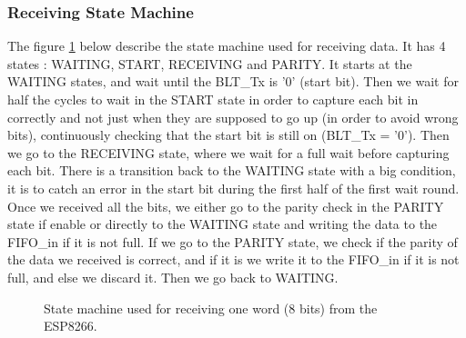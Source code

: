 \documentclass[11pt]{article}
\begin{document}
\subsubsection{Receiving State Machine}
The figure \ref{UART_receive_SM} below describe the state machine used for receiving data. It has 4 states : WAITING, START, RECEIVING and PARITY. It starts at the WAITING states, and wait until the BLT\_Tx is '0' (start bit). Then we wait for half the cycles to wait in the START state in order to capture each bit in correctly and not just when they are supposed to go up (in order to avoid wrong bits), continuously checking that the start bit is still on (BLT\_Tx = '0'). Then we go to the RECEIVING state, where we wait for a full wait before capturing each bit. There is a transition back to the WAITING state with a big condition, it is to catch an error in the start bit during the first half of the first wait round. Once we received all the bits, we either go to the parity check in the PARITY state if enable or directly to the WAITING state and writing the data to the FIFO\_in if it is not full. If we go to the PARITY state, we check if the parity of the data we received is correct, and if it is we write it to the FIFO\_in if it is not full, and else we discard it. Then we go back to WAITING.
\begin{figure}[H]
    \caption{State machine used for receiving one word (8 bits) from the ESP8266.}
    \label{UART_receive_SM}
\end{figure}
\end{document}
